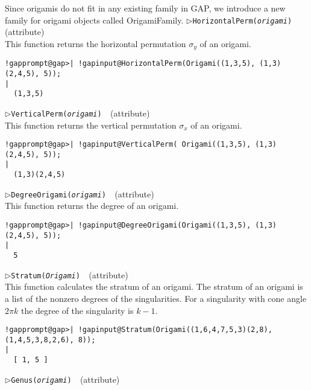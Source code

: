 \documentclass[a4paper,11pt]{report}
\begin{document}
{{{ Since origamis do not fit in any existing family in \textsf{GAP}, we introduce a new family for origami objects called OrigamiFamily. \noindent\textcolor{FuncColor}{$\triangleright$\enspace\texttt{HorizontalPerm({\mdseries\slshape origami})
\label{HorizontalPerm}
}\hfill{\scriptsize (attribute)}}\\


 This function returns the horizontal permutation $\sigma_y$ of an origami. 
\begin{Verbatim}[commandchars=!@|,fontsize=\small,frame=single,label=Example]
  !gapprompt@gap>| !gapinput@HorizontalPerm(Origami((1,3,5), (1,3)(2,4,5), 5));
|
  (1,3,5)
\end{Verbatim}
 \noindent\textcolor{FuncColor}{$\triangleright$\enspace\texttt{VerticalPerm({\mdseries\slshape origami})
\label{VerticalPerm}
}\hfill{\scriptsize (attribute)}}\\


 This function returns the vertical permutation $\sigma_x$ of an origami. 
\begin{Verbatim}[commandchars=!@|,fontsize=\small,frame=single,label=Example]
  !gapprompt@gap>| !gapinput@VerticalPerm( Origami((1,3,5), (1,3)(2,4,5), 5));
|
  (1,3)(2,4,5)
\end{Verbatim}
 \noindent\textcolor{FuncColor}{$\triangleright$\enspace\texttt{DegreeOrigami({\mdseries\slshape origami})
\label{DegreeOrigami}
}\hfill{\scriptsize (attribute)}}\\


 This function returns the degree of an origami. 
\begin{Verbatim}[commandchars=!@|,fontsize=\small,frame=single,label=Example]
  !gapprompt@gap>| !gapinput@DegreeOrigami(Origami((1,3,5), (1,3)(2,4,5), 5));
|
  5
\end{Verbatim}
 \noindent\textcolor{FuncColor}{$\triangleright$\enspace\texttt{Stratum({\mdseries\slshape Origami})
\label{Stratum}
}\hfill{\scriptsize (attribute)}}\\


 This function calculates the stratum of an origami. The stratum of an origami
is a list of the nonzero degrees of the singularities. For a singularity with
cone angle $2\pi k$ the degree of the singularity is $k-1$. 
\begin{Verbatim}[commandchars=!@|,fontsize=\small,frame=single,label=Example]
  !gapprompt@gap>| !gapinput@Stratum(Origami((1,6,4,7,5,3)(2,8), (1,4,5,3,8,2,6), 8));
|
  [ 1, 5 ]
\end{Verbatim}
 \noindent\textcolor{FuncColor}{$\triangleright$\enspace\texttt{Genus({\mdseries\slshape origami})
\label{Genus}
}\hfill{\scriptsize (attribute)}}\\


}}}
\end{document}
